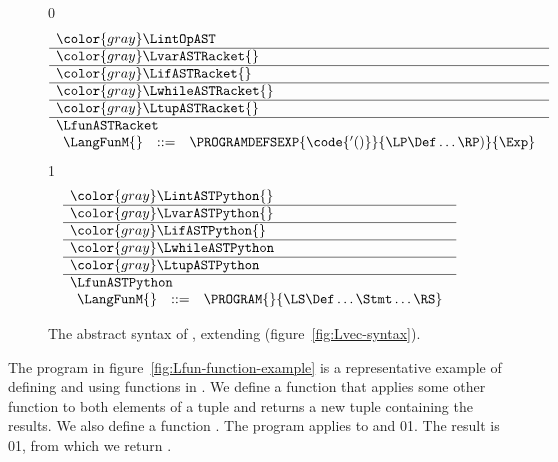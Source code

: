 \documentclass[7x10]{TimesAPriori_MIT}%
\newcommand{\gray}[1]{{\color{gray} #1}}
\def\racketEd{0}
\def\pythonEd{1}
\def\edition{0}
\newcommand{\racket}[1]{{\if\edition\racketEd{#1}\fi}}
\newcommand{\python}[1]{{\if\edition\pythonEd #1\fi}}
\numberwithin{theorem}{chapter}
\numberwithin{definition}{chapter}
\numberwithin{equation}{chapter}
\begin{document}
\begin{figure}[tp]
\centering
\begin{tcolorbox}[colback=white]
    \small
{\if\edition\racketEd
\[
\begin{array}{l}
  \gray{\LintOpAST} \\ \hline
  \gray{\LvarASTRacket{}} \\ \hline
  \gray{\LifASTRacket{}} \\ \hline
  \gray{\LwhileASTRacket{}} \\ \hline
  \gray{\LtupASTRacket{}} \\ \hline
  \LfunASTRacket \\
  \begin{array}{lcl}
  \LangFunM{} &::=& \PROGRAMDEFSEXP{\code{'()}}{\LP\Def\ldots\RP)}{\Exp}
  \end{array}
\end{array}
\]
\fi}
{\if\edition\pythonEd
\[
\begin{array}{l}
  \gray{\LintASTPython{}} \\ \hline
  \gray{\LvarASTPython{}} \\ \hline
  \gray{\LifASTPython{}} \\ \hline
  \gray{\LwhileASTPython} \\ \hline
  \gray{\LtupASTPython} \\  \hline
  \LfunASTPython \\
\begin{array}{rcl}
  \LangFunM{} &::=& \PROGRAM{}{\LS \Def \ldots \Stmt \ldots \RS}
\end{array}
\end{array}
\]
\fi}
\end{tcolorbox}

\caption{The abstract syntax of \LangFun{}, extending \LangVec{} (figure~\ref{fig:Lvec-syntax}).}
\label{fig:Lfun-syntax}
\end{figure}


The program in figure~\ref{fig:Lfun-function-example} is a
representative example of defining and using functions in \LangFun{}.
We define a function  that applies some other function
 to both elements of a tuple and returns a new tuple
containing the results. We also define a function .  The
program applies  to  and
%
\racket{}\python{}.
%
The result is \racket{}\python{},
%
from which we return .
\end{document}
